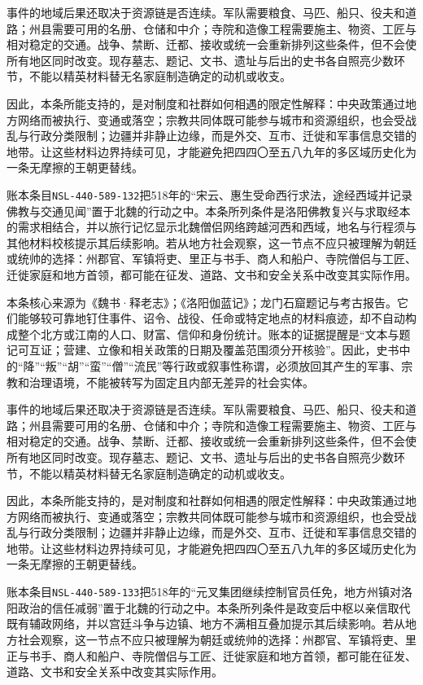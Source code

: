 事件的地域后果还取决于资源链是否连续。军队需要粮食、马匹、船只、役夫和道路；州县需要可用的名册、仓储和中介；寺院和造像工程需要施主、物资、工匠与相对稳定的交通。战争、禁断、迁都、接收或统一会重新排列这些条件，但不会使所有地区同时改变。现存墓志、题记、文书、遗址与后出的史书各自照亮少数环节，不能以精英材料替无名家庭制造确定的动机或收支。

因此，本条所能支持的，是对制度和社群如何相遇的限定性解释：中央政策通过地方网络而被执行、变通或落空；宗教共同体既可能参与城市和资源组织，也会受战乱与行政分类限制；边疆并非静止边缘，而是外交、互市、迁徙和军事信息交错的地带。让这些材料边界持续可见，才能避免把四四〇至五八九年的多区域历史化为一条无摩擦的王朝更替线。

账本条目\texttt{NSL-440-589-132}把518年的“宋云、惠生受命西行求法，途经西域并记录佛教与交通见闻”置于北魏的行动之中。本条所列条件是洛阳佛教复兴与求取经本的需求相结合，并以旅行记忆显示北魏僧侣网络跨越河西和西域，地名与行程须与其他材料校核提示其后续影响。若从地方社会观察，这一节点不应只被理解为朝廷或统帅的选择：州郡官、军镇将吏、里正与书手、商人和船户、寺院僧侣与工匠、迁徙家庭和地方首领，都可能在征发、道路、文书和安全关系中改变其实际作用。

本条核心来源为《魏书·释老志》；《洛阳伽蓝记》；龙门石窟题记与考古报告。它们能够较可靠地钉住事件、诏令、战役、任命或特定地点的材料痕迹，却不自动构成整个北方或江南的人口、财富、信仰和身份统计。账本的证据提醒是“文本与题记可互证；营建、立像和相关政策的日期及覆盖范围须分开核验”。因此，史书中的“降”“叛”“胡”“蛮”“僧”“流民”等行政或叙事性称谓，必须放回其产生的军事、宗教和治理语境，不能被转写为固定且内部无差异的社会实体。

事件的地域后果还取决于资源链是否连续。军队需要粮食、马匹、船只、役夫和道路；州县需要可用的名册、仓储和中介；寺院和造像工程需要施主、物资、工匠与相对稳定的交通。战争、禁断、迁都、接收或统一会重新排列这些条件，但不会使所有地区同时改变。现存墓志、题记、文书、遗址与后出的史书各自照亮少数环节，不能以精英材料替无名家庭制造确定的动机或收支。

因此，本条所能支持的，是对制度和社群如何相遇的限定性解释：中央政策通过地方网络而被执行、变通或落空；宗教共同体既可能参与城市和资源组织，也会受战乱与行政分类限制；边疆并非静止边缘，而是外交、互市、迁徙和军事信息交错的地带。让这些材料边界持续可见，才能避免把四四〇至五八九年的多区域历史化为一条无摩擦的王朝更替线。

账本条目\texttt{NSL-440-589-133}把518年的“元叉集团继续控制官员任免，地方州镇对洛阳政治的信任减弱”置于北魏的行动之中。本条所列条件是政变后中枢以亲信取代既有辅政网络，并以宫廷斗争与边镇、地方不满相互叠加提示其后续影响。若从地方社会观察，这一节点不应只被理解为朝廷或统帅的选择：州郡官、军镇将吏、里正与书手、商人和船户、寺院僧侣与工匠、迁徙家庭和地方首领，都可能在征发、道路、文书和安全关系中改变其实际作用。

